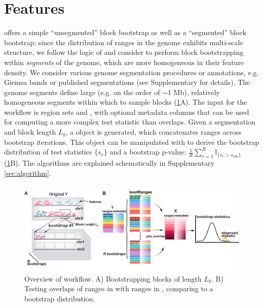 \section{Features}

\bootranges offers a simple ``unsegmented'' block bootstrap as well as
a ``segmented'' block bootstrap:
since the distribution of ranges in the genome exhibits multi-scale
structure, we follow the logic of \citet{bickel2010subsampling} and consider to
perform block bootstrapping within \textit{segments} of the genome, which are
more homogeneous in their feature density.
We consider various genome segmentation procedures
or annotations, e.g. Giemsa bands or published segmentations
(see Supplementary for details).
The genome segments define large (e.g. on the order of ${\sim}1$ Mb),
relatively homogeneous segments within which to sample blocks
(\cref{fig:framework}A). 
The input for the workflow is region sets  and
, with optional metadata columns that can be
used for computing a more complex test statistic than overlaps.
Given a segmentation and block length $L_b$, a \bootranges
object is generated, which concatenates ranges across bootstrap
iterations. This \bootranges object can be manipulated with \plyranges
to derive the bootstrap distribution of test statistics $\{s_r\}$ and a
bootstrap p-value:
$ \frac{1}{R} \sum_{r=1}^R \mathbb{I}_{\{s_r > s_\text{obs}\}} $ (\cref{fig:framework}B).
The \bootranges algorithms are explained schematically in Supplementary \cref{sec:algorithm}.

\begin{figure}[t]
\centering%
\includegraphics[scale=0.9]{Figures/bootRanges.jpg}
\caption{Overview of \bootranges workflow.
  A) Bootstrapping blocks of length $L_b$.
  B) Testing overlaps of ranges in  with ranges in
  , comparing to a bootstrap distribution.} 
\label{fig:framework}
\end{figure}

